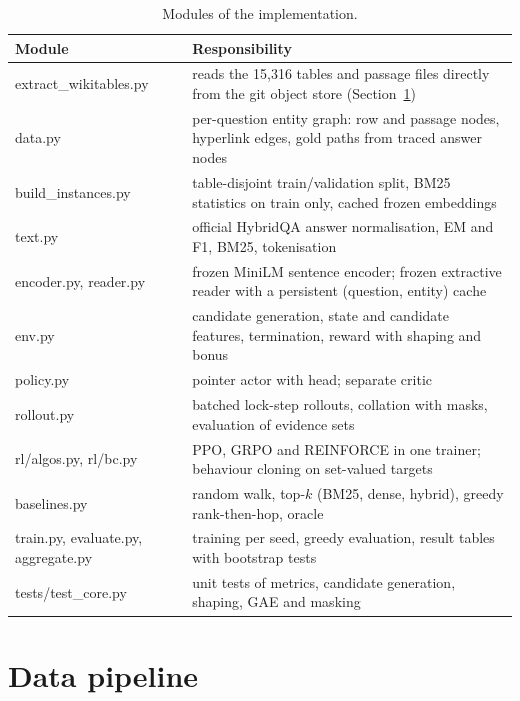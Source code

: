 \begin{table}[ht]
\centering
\footnotesize
\caption{Modules of the implementation.}
\label{tab:modules}
\begin{tabularx}{\textwidth}{@{}>{\ttfamily}l>{\raggedright\arraybackslash}X@{}}
\toprule
\normalfont Module & Responsibility \\
\midrule
extract\_wikitables.py & reads the 15{,}316 tables and passage files directly from the git object store (Section~\ref{sec:datapipe}) \\
data.py & per-question entity graph: row and passage nodes, hyperlink edges, gold paths from traced answer nodes \\
build\_instances.py & table-disjoint train/validation split, BM25 statistics on train only, cached frozen embeddings \\
text.py & official HybridQA answer normalisation, EM and F1, BM25, tokenisation \\
encoder.py, reader.py & frozen MiniLM sentence encoder; frozen extractive reader with a persistent (question, entity) cache \\
env.py & candidate generation, state and candidate features, termination, reward with shaping and bonus \\
policy.py & pointer actor with \STOP{} head; separate critic \\
rollout.py & batched lock-step rollouts, collation with masks, evaluation of evidence sets \\
rl/algos.py, rl/bc.py & PPO, GRPO and REINFORCE in one trainer; behaviour cloning on set-valued targets \\
baselines.py & random walk, top-$k$ (BM25, dense, hybrid), greedy rank-then-hop, oracle \\
train.py, evaluate.py, aggregate.py & training per seed, greedy evaluation, result tables with bootstrap tests \\
tests/test\_core.py & unit tests of metrics, candidate generation, shaping, GAE and masking \\
\bottomrule
\end{tabularx}
\end{table}

\section{Data pipeline}
\label{sec:datapipe}


